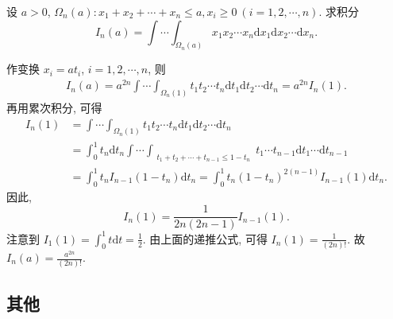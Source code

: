 \documentclass[../../main.tex]{subfiles}
\begin{document}
\begin{example}
设 \( a > 0 \), \( \Omega_n(a) : x_1 + x_2 + \cdots + x_n \leqslant a, x_i \geqslant 0\ (i = 1,2,\cdots,n) \). 求积分
\[
I_n(a) = \int \cdots \int_{\Omega_n(a)} x_1 x_2 \cdots x_n \mathrm{d}x_1 \mathrm{d}x_2 \cdots \mathrm{d}x_n.
\]
\end{example}
\begin{solution}
作变换 \( x_i = a t_i \), \( i = 1,2,\cdots,n \), 则
\begin{align*}
I_n(a) = a^{2n} \int \cdots \int_{\Omega_n(1)} t_1 t_2 \cdots t_n \mathrm{d}t_1 \mathrm{d}t_2 \cdots \mathrm{d}t_n = a^{2n} I_n(1).
\end{align*}
再用累次积分, 可得
\begin{align*}
I_n(1) &= \int \cdots \int_{\Omega_n(1)} t_1 t_2 \cdots t_n \mathrm{d}t_1 \mathrm{d}t_2 \cdots \mathrm{d}t_n
\\
&= \int_0^1 t_n \mathrm{d}t_n \int \cdots \int_{\substack{t_1 + t_2 + \cdots + t_{n-1} \leqslant 1 - t_n}} t_1 \cdots t_{n-1} \mathrm{d}t_1 \cdots \mathrm{d}t_{n-1}
\\
&= \int_0^1 t_n I_{n-1}(1 - t_n) \mathrm{d}t_n = \int_0^1 t_n (1 - t_n)^{2(n-1)} I_{n-1}(1) \mathrm{d}t_n.
\end{align*}
因此,
\[
I_n(1) = \frac{1}{2n(2n - 1)} I_{n-1}(1).
\]
注意到 \( I_1(1) = \int_0^1 t \mathrm{d}t = \frac{1}{2} \). 由上面的递推公式, 可得 \( I_n(1) = \frac{1}{(2n)!} \). 故 \( I_n(a) = \frac{a^{2n}}{(2n)!} \).
\end{solution}












\subsection{其他}
\end{document}
